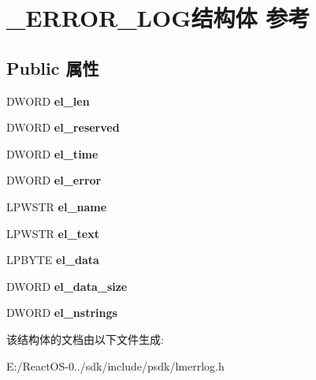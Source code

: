 \hypertarget{struct___e_r_r_o_r___l_o_g}{}\section{\+\_\+\+E\+R\+R\+O\+R\+\_\+\+L\+O\+G结构体 参考}
\label{struct___e_r_r_o_r___l_o_g}
\subsection*{Public 属性}
\begin{DoxyCompactItemize}
\item 
\mbox{\label{struct___e_r_r_o_r___l_o_g_a8de2b0a531adb42ca5bc2ce9bd48dfce}} 
D\+W\+O\+RD {\bfseries el\+\_\+len}
\item 
\mbox{\label{struct___e_r_r_o_r___l_o_g_a8b465812178a83ccaa7a1efc48a4c8c2}} 
D\+W\+O\+RD {\bfseries el\+\_\+reserved}
\item 
\mbox{\label{struct___e_r_r_o_r___l_o_g_aae301330b408c37ce55eb236dba53757}} 
D\+W\+O\+RD {\bfseries el\+\_\+time}
\item 
\mbox{\label{struct___e_r_r_o_r___l_o_g_a2f03ade63bde019dad1736ca73f2975f}} 
D\+W\+O\+RD {\bfseries el\+\_\+error}
\item 
\mbox{\label{struct___e_r_r_o_r___l_o_g_a244730daef1130f56cddf31eab47b850}} 
L\+P\+W\+S\+TR {\bfseries el\+\_\+name}
\item 
\mbox{\label{struct___e_r_r_o_r___l_o_g_a143048da423861bc11814dddfd41a2a0}} 
L\+P\+W\+S\+TR {\bfseries el\+\_\+text}
\item 
\mbox{\label{struct___e_r_r_o_r___l_o_g_a62961e9f28428dec4db26f3643408bf1}} 
L\+P\+B\+Y\+TE {\bfseries el\+\_\+data}
\item 
\mbox{\label{struct___e_r_r_o_r___l_o_g_a7955467c7e3c6385275c7552410dff42}} 
D\+W\+O\+RD {\bfseries el\+\_\+data\+\_\+size}
\item 
\mbox{\label{struct___e_r_r_o_r___l_o_g_a896fd9f2dcb9cfda16bbb5f2170a3eb7}} 
D\+W\+O\+RD {\bfseries el\+\_\+nstrings}
\end{DoxyCompactItemize}


该结构体的文档由以下文件生成\+:\begin{DoxyCompactItemize}
\item 
E\+:/\+React\+O\+S-\/0../sdk/include/psdk/lmerrlog.\+h\end{DoxyCompactItemize}
